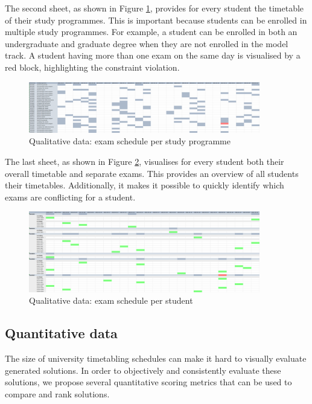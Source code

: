 The second sheet, as shown in Figure \ref{fig:sheet2}, provides for every student the timetable of their study programmes. This is important because students can be enrolled in multiple study programmes. For example, a student can be enrolled in both an undergraduate and graduate degree when they are not enrolled in the model track. A student having more than one exam on the same day is visualised by a red block, highlighting the constraint violation.

\begin{figure}[H]
	\centering
	\includegraphics[width=0.9\textwidth]{images/excel/excel_sheet2.png} 
	\caption{Qualitative data: exam schedule per study programme}
	\label{fig:sheet2}
\end{figure}

The last sheet, as shown in Figure \ref{fig:sheet3}, visualises for every student both their overall timetable and separate exams. This provides an overview of all students their timetables. Additionally, it makes it possible to quickly identify which exams are conflicting for a student.

\begin{figure}[H]
	\centering
	\includegraphics[width=0.9\textwidth]{images/excel/excel_sheet3.png} 
	\caption{Qualitative data: exam schedule per student}
	\label{fig:sheet3}
\end{figure}

\subsection{Quantitative data} \label{quantitative}

The size of university timetabling schedules can make it hard to visually evaluate generated solutions. In order to objectively and consistently evaluate these solutions, we propose several quantitative scoring metrics that can be used to compare and rank solutions.

